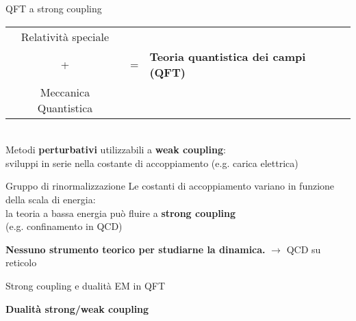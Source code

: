 \documentclass[10pt,compress,usenames,dvipsnames]{beamer}
\begin{document}
\begin{frame}{QFT a strong coupling}
\begin{tabular}{c l l }
Relatività speciale  & \\[0,1cm]
{\Large +} & {\Large=}  & \alert{ \bfseries \large Teoria quantistica dei campi (QFT) }\\
Meccanica Quantistica & \\
\end{tabular}
\\
\vspace{0.3cm}
Metodi {\bfseries perturbativi} utilizzabili a \alert{\bfseries weak coupling}: \\
sviluppi in serie nella costante di accoppiamento (\small e.g.\alert { carica elettrica}) \\[0,4cm]

\begin{block}{Gruppo di rinormalizzazione}
Le costanti di accoppiamento variano in funzione della scala di energia:	\\
la teoria a bassa energia può fluire a \alert{ \bfseries strong coupling} \\
(e.g. confinamento in QCD)
\end{block}

\alert{\bfseries Nessuno strumento teorico per studiarne la dinamica.}
$\longrightarrow$ QCD su reticolo

\end{frame}



\begin{frame}{Strong coupling e dualità EM in QFT}
\begin{center}
 \alert{\bfseries \Large Dualità strong/weak coupling}
\end{center}

\end{frame}
\end{document}
